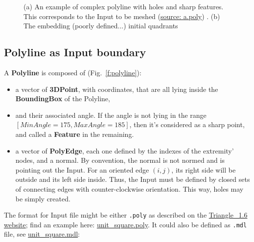 \documentclass[10pt]{article}
\begin{document}
 \begin{figure}[htb]
\centering
\label{fig:boundary}
\caption{ (a) An example of complex polyline with holes and sharp features. This corresponds to the Input to be meshed (\href{https://github.com/jaillet/MixedQuadTree/blob/master/data/a.poly}{source: a.poly}) . (b) The embedding (poorly defined...) initial quadrants }
\end{figure}

\subsection {Polyline as Input boundary}

A \textbf{Polyline} is composed of (Fig.~\ref{f:polyline}):
\begin{itemize}
\item a vector of  \textbf{3DPoint}, with coordinates, that are all lying inside the \textbf{BoundingBox} of the Polyline,
\item and their associated angle. If the angle is not lying in the range $[MinAngle=175,MaxAngle=185]$, then it's considered as a sharp point, and called  a \textbf{Feature} in the remaining.
\item a vector of \textbf{PolyEdge}, each one defined by the indexes of the extremity' nodes, and a normal. By convention, the normal is not normed and is pointing out the Input. For an oriented edge $(i,j)$, its right side will be outside and its left side inside. Thus, the Input must be defined by closed sets of connecting edges with counter-clockwise orientation. This way, holes may be simply created.
\end{itemize}
The format for Input file might be either \verb?.poly? as described on the \href{https://www.cs.cmu.edu/~quake/triangle.poly.html}{ Triangle\_1.6 website}; find an example here: \href{https://github.com/jaillet/MixedQuadTree/blob/master/data/unit\_square.poly}{unit\_square.poly}.
It could also be defined as \verb?.mdl? file, see \href{https://github.com/jaillet/MixedQuadTree/blob/master/data/unit\_square.mdl}{unit\_square.mdl}:
\end{document}
